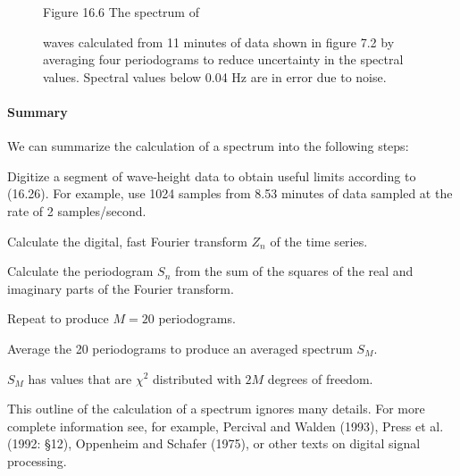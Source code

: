 \begin{figure}[t!]
\footnotesize
Figure 16.6 The spectrum of \rule{0mm}{4ex}waves calculated from 11
minutes of data shown in figure 7.2 by averaging four periodograms to
reduce uncertainty in the spectral values. Spectral values below 0.04
Hz are in error due to noise.
\label{fig:wavespectrum}
\vspace{-3ex}
\end{figure}

\paragraph{Summary}
We can summarize the calculation of a spectrum into the following
steps:
\begin{enumerate}
\vitem Digitize a segment of wave-height data to obtain useful limits
according to (16.26). For example, use 1024 samples from 8.53 minutes
of data sampled at the rate of 2 samples/second.

\vitem Calculate the digital, fast Fourier transform $Z_{n}$ of the
time series.

\vitem Calculate the periodogram $S_{n}$ from the sum of the squares
of the real and imaginary parts of the Fourier transform.

\vitem Repeat to produce $M=20$ periodograms.

\vitem Average the 20 periodograms to produce an averaged spectrum
$S_{M}$.

\vitem $S_{M}$ has values that are $\chi ^{2}$ distributed with $2 M$
degrees of freedom.
\end{enumerate}
This outline of the calculation of a spectrum ignores many
details. For more complete information see, for example, Percival and
Walden (1993), Press et al.  (1992: \S 12), Oppenheim and Schafer
(1975), or other texts on digital signal processing.

